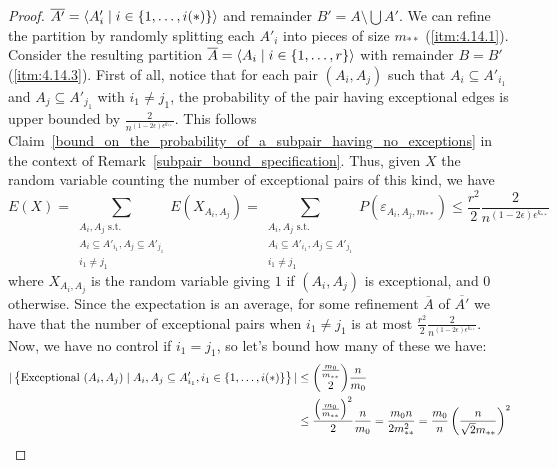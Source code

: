 \begin{lemma}[Claim 4.14]
\begin{proof}
            $\overline{A'} = \left< A'_i \mid i \in \left\{ 1, \dots, i(*) \right\} \right>$ and remainder $B' = A \setminus \bigcup A'$.
            We can refine the partition by randomly splitting each $A'_i$ into pieces of size $m_{**}$ (\ref{itm:4.14.1}).
            Consider the resulting partition $\overline{A} = \left< A_i \mid i \in \left\{ 1, \dots, r \right\} \right>$ with remainder $B = B'$
            (\ref{itm:4.14.3}).
            First of all, notice that for each pair $(A_i, A_j)$ such that $A_i \subseteq A'_{i_1}$ and
            $A_j \subseteq A'_{j_1}$ with $i_1 \neq j_1$, the probability of the pair having exceptional edges is
            upper bounded by $\frac{2}{n^{(1-2\epsilon)\epsilon^{k_{**}}}}$.
            This follows Claim~\ref{bound_on_the_probability_of_a_subpair_having_no_exceptions} in the context of
            Remark~\ref{subpair_bound_specification}.
            Thus, given $X$ the random variable counting the number of exceptional pairs of this kind, we have
            \[
                E(X) = \sum_{\substack{A_i,A_j \text{ s.t.}\\A_i\subseteq A'_{i_1},A_j\subseteq A'_{j_1}\\i_1\neq j_1}} E(X_{A_i, A_j})
                     = \sum_{\substack{A_i,A_j \text{ s.t.}\\A_i\subseteq A'_{i_1},A_j\subseteq A'_{j_1}\\i_1\neq j_1}} P(\varepsilon_{A_i, A_j,m_{**}})
                     \leq \frac{r^2}{2} \frac{2}{n^{(1-2\epsilon)\epsilon^{k_{**}}}}
            \]
            where $X_{A_i,A_j}$ is the random variable giving $1$ if $(A_i, A_j)$ is exceptional, and $0$ otherwise.
            Since the expectation is an average, for some refinement $\overline{A}$ of $\overline{A'}$ we have that
            the number of exceptional pairs when $i_1 \neq j_1$ is at most $\frac{r^2}{2} \frac{2}{n^{(1-2\epsilon)\epsilon^{k_{**}}}}$.
            Now, we have no control if $i_1 = j_1$, so let's bound how many of these we have:
            \[
                \begin{split}
                    |\parcurly{\text{Exceptional } (A_i, A_j) \mid A_i, A_j \subseteq A'_{i_1}, i_1 \in \parcurly{1, \dots, i(*)}}|
                        & \leq {\frac{m_0}{m_{**}} \choose 2} \frac{n}{m_0} \\
                        & \leq \frac{\parround{\frac{m_0}{m_{**}}}^2}{2} \frac{n}{m_0}
                            = \frac{m_0 n}{2 m_{**}^2}
                            = \frac{m_0}{n} \parround{\frac{n}{\sqrt{2}m_{**}}}^2 \\

\end{split}\]
\end{proof}
\end{lemma}
